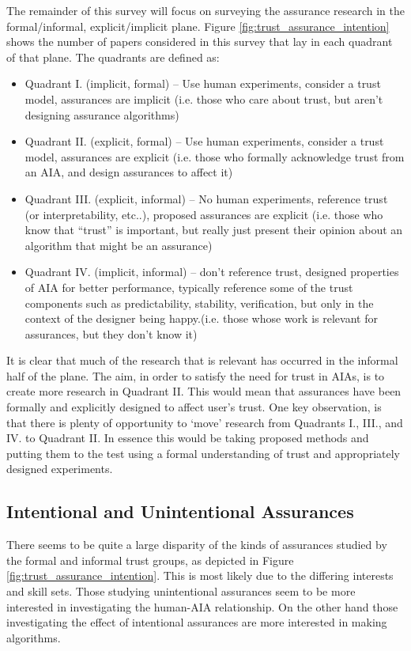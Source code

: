 The remainder of this survey will focus on surveying the assurance research in the formal/informal, explicit/implicit plane. Figure \ref{fig:trust_assurance_intention} shows the number of papers considered in this survey that lay in each quadrant of that plane. The quadrants are defined as:

\begin{itemize}
    \item Quadrant I. (implicit, formal) -- Use human experiments, consider a trust model, assurances are implicit (i.e. those who care about trust, but aren't designing assurance algorithms)
    \item Quadrant II. (explicit, formal) -- Use human experiments, consider a trust model, assurances are explicit (i.e. those who formally acknowledge trust from an AIA, and design assurances to affect it)
    \item Quadrant III. (explicit, informal) -- No human experiments, reference trust (or interpretability, etc..), proposed assurances are explicit (i.e. those who know that ``trust'' is important, but really just present their opinion about an algorithm that might be an assurance)
    \item Quadrant IV. (implicit, informal) -- don't reference trust, designed properties of AIA for better performance, typically reference some of the trust components such as predictability, stability, verification, but only in the context of the designer being happy.(i.e. those whose work is relevant for assurances, but they don't know it)
\end{itemize}

It is clear that much of the research that is relevant has occurred in the informal half of the plane. The aim, in order to satisfy the need for trust in AIAs, is to create more research in Quadrant II. This would mean that assurances have been formally and explicitly designed to affect user's trust. One key observation, is that there is plenty of opportunity to `move' research from Quadrants I., III., and IV. to Quadrant II. In essence this would be taking proposed methods and putting them to the test using a formal understanding of trust and appropriately designed experiments.

\subsection{Intentional and Unintentional Assurances}
    There seems to be quite a large disparity of the kinds of assurances studied by the formal and informal trust groups, as depicted in Figure \ref{fig:trust_assurance_intention}.  This is most likely due to the differing interests and skill sets. Those studying unintentional assurances seem to be more interested in investigating the human-AIA relationship. On the other hand those investigating the effect of intentional assurances are more interested in making algorithms.
    
